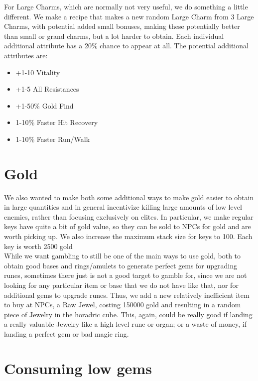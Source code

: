 \documentclass[12pt,a4paper]{article}
\begin{document}
For Large Charms, which are normally not very useful, we do something a little different. We make a recipe that makes a new random Large Charm from 3 Large Charms, with potential added small bonuses, making these potentially better than small or grand charms, but a lot harder to obtain. Each individual additional attribute has a 20\% chance to appear at all. The potential additional attributes are:

\begin{itemize}
\item +1-10  Vitality
\item +1-5 All Resistances
\item +1-50\% Gold Find
\item 1-10\% Faster Hit Recovery
\item 1-10\% Faster Run/Walk
\end{itemize}

\section{Gold}

We also wanted to make both some additional ways to make gold easier to obtain in large quantities and in general incentivize killing large amounts of low level enemies, rather than focusing exclusively on elites. In particular, we make regular keys have quite a bit of  gold value, so they can be sold to NPCs for gold and are worth picking up. We also increase the maximum stack size for keys to 100. Each key is worth 2500 gold\\

While we want gambling to still be one of the main ways to use gold, both to obtain good bases and rings/amulets to generate perfect gems for upgrading runes, sometimes there just is not a good target to gamble for, since we are not looking for any particular item or base that we do not have like that, nor for additional gems to upgrade runes. Thus, we add a new relatively inefficient item to buy at NPCs, a Raw Jewel, costing 150000 gold and resulting in a random piece of Jewelry in the horadric cube. This, again, could be really good if landing a really valuable Jewelry like a high level rune or organ; or a waste of money, if landing a perfect gem or bad magic ring.\\

\section{Consuming low gems}
\end{document}
